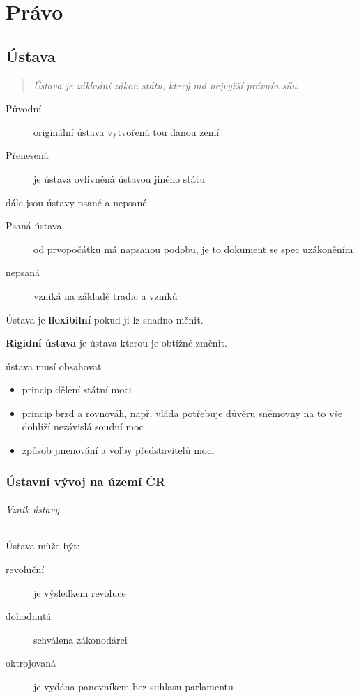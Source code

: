 \documentclass[10pt,a4paper,
twoside,%
]{report}
\begin{document}

\part{Právo}
\chapter{Ústava}
\begin{quote}
\emph{Ústava je základní zákon státu, který má nejvyžší právnín sílu.}
\end{quote}

\begin{description}
\item[Původní] originální ústava vytvořená tou danou zemí
\item[Přenesená] je ústava ovlivněná ústavou jiného státu
\end{description}

dále jsou ústavy psané a nepsané
\begin{description}
\item[Psaná ústava] od prvopočátku má napsanou podobu, je to dokument se spec uzákoněním
\item[nepsaná] vzniká na základě tradic a vzniků
\end{description}

Ústava je \textbf{flexibilní} pokud ji lz snadno měnit.

\textbf{Rigidní ústava} je ústava kterou je obtížné změnit.

ústava musí obsahovat
\begin{itemize}
\item princip dělení státní moci
\item princip brzd a rovnováh, např. vláda potřebuje důvěru sněmovny na to vše dohlíží nezávislá soudní moc
\item způsob jmenování a volby představitelů moci
\end{itemize}
\section[Ústavní vývoj]{Ústavní vývoj na území ČR}
\paragraph{Vznik ústavy} Ústava může být:
\begin{description}
\item[revoluční] je výsledkem revoluce
\item[dohodnutá] schválena zákonodárci
\item[oktrojovaná] je vydána panovníkem bez suhlasu parlamentu
\end{description}
\end{document}
